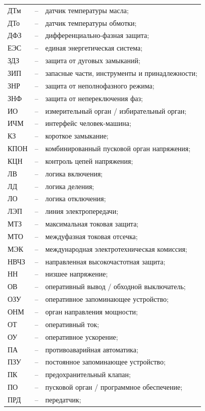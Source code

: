 \begin{longtable}{>{\raggedright\arraybackslash}m{2cm}>{\raggedright\arraybackslash}m{0.5cm}>{\raggedright\arraybackslash}m{20cm}}
ДТм & -- & датчик температуры масла; \\
ДТо & -- & датчик температуры обмотки; \\
ДФЗ & -- & дифференциально-фазная защита; \\
ЕЭС & -- & единая энергетическая система; \\
ЗДЗ & -- & защита от дуговых замыканий; \\
ЗИП & -- & запасные части, инструменты и принадлежности; \\
ЗНР & -- & защита от неполнофазного режима; \\
ЗНФ & -- & защита от непереключения фаз; \\
ИО & -- & измерительный орган / избирательный орган; \\
ИЧМ & -- & интерфейс человек-машина; \\
КЗ & -- & короткое замыкание; \\
КПОН & -- & комбинированный пусковой орган напряжения; \\
КЦН & -- & контроль цепей напряжения; \\
ЛВ & -- & логика включения; \\
ЛД & -- & логика деления; \\
ЛО & -- & логика отключения; \\
ЛЭП & -- & линия электропередачи; \\
МТЗ & -- & максимальная токовая защита; \\
МТО & -- & междуфазная токовая отсечка; \\
МЭК & -- & международная электротехническая комиссия; \\
НВЧЗ & -- & направленная высокочастотная защита; \\
НН & -- & низшее напряжение; \\
ОВ & -- & оперативный вывод / обходной выключатель; \\
ОЗУ & -- & оперативное запоминающее устройство; \\
ОНМ & -- & орган направления мощности; \\
ОТ & -- & оперативный ток; \\
ОУ & -- & оперативное ускорение; \\
ПА & -- & противоаварийная автоматика; \\
ПЗУ & -- & постоянное запоминающее устройство; \\
ПК & -- & предохранительный клапан; \\
ПО & -- & пусковой орган / программное обеспечение; \\
ПРД & -- & передатчик; \\

\end{longtable}
